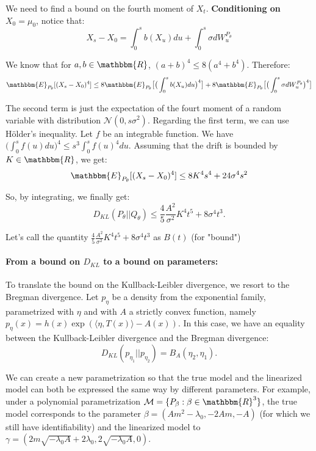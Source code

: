 \documentclass[12pt,a4paper]{article}
\theoremstyle{definition}
\theoremstyle{plain}
\begin{document}
We need to find a bound on the fourth moment of $X_t$. \textbf{Conditioning on $X_0 = \mu_0$}, notice that: 
$$
X_s - X_0 = \int_0^s b(X_u)du + \int_0^s \sigma dW_u^{P_\theta}
$$

We know that for $a,b \in \mathbbm{R}$, $(a+b)^4 \leq 8(a^4 + b^4)$. Therefore:
$$
\mathbbm{E}_{P_\theta}[(X_s - X_0)^4] \leq 8\mathbbm{E}_{P_\theta} \big[ \big( \int_0^s b(X_u)du \big)^4 \big] + 8\mathbbm{E}_{P_\theta}\big[\big(\int_0^s \sigma dW_u^{P_\theta}\big)^4\big] \\
$$

The second term is just the expectation of the fourt moment of a random variable with distribution $\mathcal{N}(0, s\sigma^2)$. Regarding the first term, we can use Hölder's inequality. Let $f$ be an integrable function. We have $\big( \int_0^s f(u)du \big)^4 \leq  s^3 \int_0^s f(u)^4du$. Assuming that the drift is bounded by $K \in \mathbbm{R}$, we get:
$$
\mathbbm{E}_{P_\theta}[(X_s - X_0)^4] \leq 8K^4s^4 + 24 \sigma^4s^2
$$

So, by integrating, we finally get: 
\begin{equation}
    D_{KL}(P_\theta || Q_\theta) \leq \frac{4}{5} \frac{A^2}{\sigma^2}K^4t^5 + 8\sigma^4t^3.
\end{equation}

Let's call the quantity $\frac{4}{5} \frac{A^2}{\sigma^2}K^4t^5 + 8\sigma^4t^3$ as $B(t)$ (for "bound")

\paragraph{From a bound on $D_{KL}$ to a bound on parameters:} To translate the bound on the Kullback-Leibler divergence, we resort to the Bregman divergence. Let $p_\eta$ be a density from the exponential family, parametrized with $\eta$ and with $A$ a strictly convex function, namely $p_\eta(x) = h(x) \exp( \langle \eta, T(x) \rangle - A(x))$. In this case, we have an equality between the Kullback-Leibler divergence and the Bregman divergence:
$$
D_{KL}(p_{\eta_1} || p_{\eta_2}) = B_A({\eta_2}, {\eta_1}).
$$


We can create a new parametrization so that the true model and the linearized model can both be expressed the same way by different parameters. For example, under a polynomial parametrization $\mathcal{M} = \{P_\beta: \beta \in \mathbbm{R}^3\}$, the true model corresponds to the parameter $\beta = (Am^2 - \lambda_0, -2Am, -A)$ (for which we still have identifiability) and the linearized model to $\gamma = (2m\sqrt{-\lambda_0A} + 2\lambda_0, 2\sqrt{-\lambda_0 A}, 0)$. \\
\end{document}
